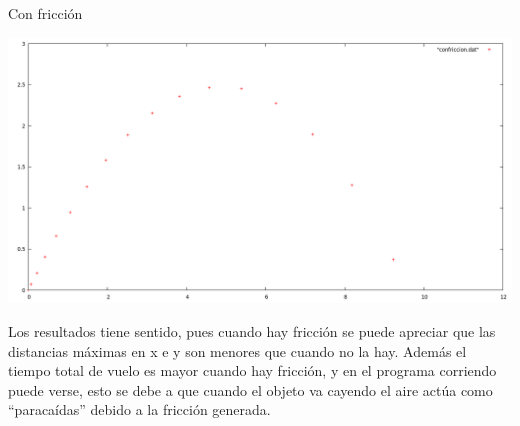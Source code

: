 \documentclass[notitlepage,12pt]{article}
\begin{document}
Con fricci\'on

\includegraphics[scale=0.3]{theta_45_plot_friction}



Los resultados tiene sentido, pues cuando hay fricci\'on se puede apreciar que las distancias m\'aximas en x e y son menores
que cuando no la hay. Adem\'as el tiempo total de vuelo es mayor cuando hay fricci\'on, y en el programa corriendo puede verse,
esto se debe a que cuando el objeto va cayendo el aire act\'ua como ``paraca\'idas'' debido a la fricci\'on generada.
\end{document}
